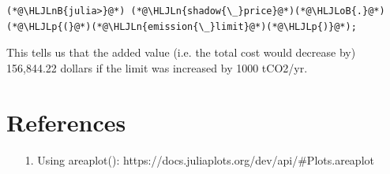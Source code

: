 \documentclass[12pt,a4paper]{article}
\newcommand{\HLJLn}[1]{#1}
\newcommand{\HLJLnB}[1]{\textcolor[RGB]{59,151,46}{#1}}
\newcommand{\HLJLoB}[1]{\textcolor[RGB]{102,102,102}{\textbf{#1}}}
\newcommand{\HLJLp}[1]{#1}
\begin{document}
\begin{lstlisting}
(*@\HLJLnB{julia>}@*) (*@\HLJLn{shadow{\_}price}@*)(*@\HLJLoB{.}@*)(*@\HLJLp{(}@*)(*@\HLJLn{emission{\_}limit}@*)(*@\HLJLp{)}@*);
\end{lstlisting}

This tells us that the added value (i.e. the total cost would decrease by) 156,844.22 dollars if the limit was increased by 1000 tCO2/yr.

\section{References}
\begin{itemize}
\item[1. ] Using areaplot(): https://docs.juliaplots.org/dev/api/\#Plots.areaplot

\end{itemize}
\end{document}

